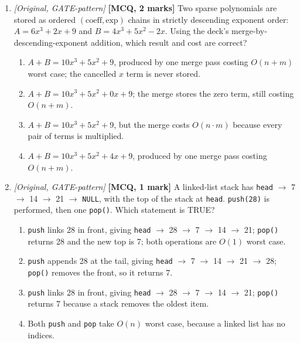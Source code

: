 \documentclass[11pt]{article}
\begin{document}
\begin{enumerate}
\item[\textbf{Q9}] \textit{[Original, GATE-pattern]} \textbf{[MCQ, 2 marks]} Two sparse polynomials are stored as ordered $(\text{coeff},\text{exp})$ chains in strictly descending exponent order: $A = 6x^{3} + 2x + 9$ and $B = 4x^{3} + 5x^{2} - 2x$. Using the deck's merge-by-descending-exponent addition, which result and cost are correct?
\begin{enumerate}
  \item[(A)] $A + B = 10x^{3} + 5x^{2} + 9$, produced by one merge pass costing $O(n+m)$ worst case; the cancelled $x$ term is never stored.
  \item[(B)] $A + B = 10x^{3} + 5x^{2} + 0x + 9$; the merge stores the zero term, still costing $O(n+m)$.
  \item[(C)] $A + B = 10x^{3} + 5x^{2} + 9$, but the merge costs $O(n \cdot m)$ because every pair of terms is multiplied.
  \item[(D)] $A + B = 10x^{3} + 5x^{2} + 4x + 9$, produced by one merge pass costing $O(n+m)$.
\end{enumerate}

\item[\textbf{Q10}] \textit{[Original, GATE-pattern]} \textbf{[MCQ, 1 mark]} A linked-list stack has \texttt{head} $\to$ 7 $\to$ 14 $\to$ 21 $\to$ \texttt{NULL}, with the top of the stack at \texttt{head}. \texttt{push(28)} is performed, then one \texttt{pop()}. Which statement is TRUE?
\begin{enumerate}
  \item[(A)] \texttt{push} links 28 in front, giving \texttt{head} $\to$ 28 $\to$ 7 $\to$ 14 $\to$ 21; \texttt{pop()} returns 28 and the new top is 7; both operations are $O(1)$ worst case.
  \item[(B)] \texttt{push} appends 28 at the tail, giving \texttt{head} $\to$ 7 $\to$ 14 $\to$ 21 $\to$ 28; \texttt{pop()} removes the front, so it returns 7.
  \item[(C)] \texttt{push} links 28 in front, giving \texttt{head} $\to$ 28 $\to$ 7 $\to$ 14 $\to$ 21; \texttt{pop()} returns 7 because a stack removes the oldest item.
  \item[(D)] Both \texttt{push} and \texttt{pop} take $O(n)$ worst case, because a linked list has no indices.
\end{enumerate}

\end{enumerate}
\end{document}
